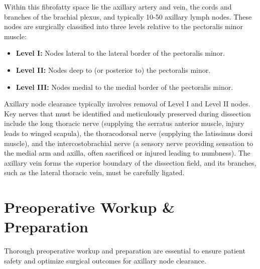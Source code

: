 Within this fibrofatty space lie the axillary artery and vein, the cords and branches of the brachial plexus, and typically 10-50 axillary lymph nodes. These nodes are surgically classified into three levels relative to the pectoralis minor muscle:
\begin{itemize}
  \item \textbf{Level I:} Nodes lateral to the lateral border of the pectoralis minor.
  \item \textbf{Level II:} Nodes deep to (or posterior to) the pectoralis minor.
  \item \textbf{Level III:} Nodes medial to the medial border of the pectoralis minor.
\end{itemize}
Axillary node clearance typically involves removal of Level I and Level II nodes. Key nerves that must be identified and meticulously preserved during dissection include the long thoracic nerve (supplying the serratus anterior muscle, injury leads to winged scapula), the thoracodorsal nerve (supplying the latissimus dorsi muscle), and the intercostobrachial nerve (a sensory nerve providing sensation to the medial arm and axilla, often sacrificed or injured leading to numbness). The axillary vein forms the superior boundary of the dissection field, and its branches, such as the lateral thoracic vein, must be carefully ligated.

\section*{Preoperative Workup \& Preparation}
Thorough preoperative workup and preparation are essential to ensure patient safety and optimize surgical outcomes for axillary node clearance.

